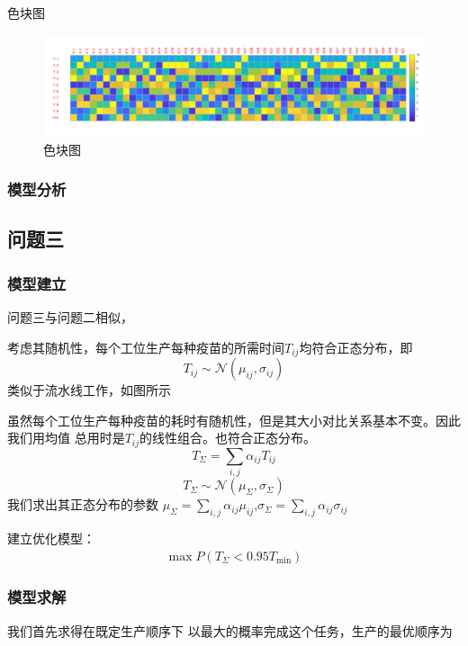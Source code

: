 \documentclass[UTF8]{ctexart}
\begin{document}
\begin{enumerate}
	色块图
		\begin{figure}[H]
			\centering %
			\includegraphics[scale=0.5]{2_sekuai.jpg}
			\caption{色块图}
		\end{figure}
	\end{enumerate}
	
	\subsubsection{模型分析}
	
	\subsection{问题三}
	\subsubsection{模型建立}
	问题三与问题二相似，
	
	考虑其随机性，每个工位生产每种疫苗的所需时间$T_{ij}$均符合正态分布，即
	\begin{equation}
	T_{ij}\sim\mathcal{N}(\mu_{ij},\sigma_{ij})
	\end{equation}
	类似于流水线工作，如图所示
	
	虽然每个工位生产每种疫苗的耗时有随机性，但是其大小对比关系基本不变。因此我们用均值
	总用时是$T_{ij}$的线性组合。也符合正态分布。
	\begin{equation}
	T_{\Sigma}=\sum_{i,j}\alpha_{ij}T_{ij}
	\end{equation}
	\begin{equation}
	T_{\Sigma}\sim\mathcal{N}(\mu_{\Sigma},\sigma_{\Sigma})
	\end{equation}
	我们求出其正态分布的参数
	$\mu_{\Sigma}=\sum_{i,j}\alpha_{ij}\mu_{ij}$,$\sigma_{\Sigma}=\sum_{i,j}\alpha_{ij}\sigma_{ij}$
	\par 建立优化模型：
	\begin{equation}
	\begin{split}
	\max P(T_{\Sigma}<0.95T_{\min})
	\end{split}
	\end{equation}
	\subsubsection{模型求解}
	我们首先求得在既定生产顺序下
	以最大的概率完成这个任务，生产的最优顺序为
\end{document}
